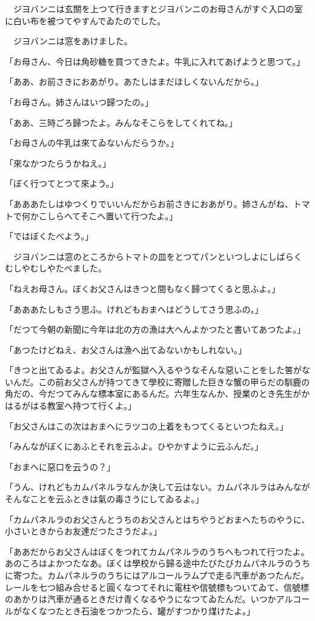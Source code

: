 \documentclass[tate,paper=b6j,jafontsize=9pt]{jlreq}
\begin{document}
　ジヨバンニは玄關を上つて行きますとジヨバンニのお母さんがすぐ入口の室に白い布を被つてやすんでゐたのでした。

　ジヨバンニは窓をあけました。

「お母さん、今日は角砂糖を買つてきたよ。牛乳に入れてあげようと思つて。」

「ああ、お前さきにおあがり。あたしはまだほしくないんだから。」

「お母さん。姉さんはいつ歸つたの。」

「ああ、三時ごろ歸つたよ。みんなそこらをしてくれてね。」

「お母さんの牛乳は來てゐないんだらうか。」

「來なかつたらうかねえ。」

「ぼく行つてとつて來よう。」

「あああたしはゆつくりでいいんだからお前さきにおあがり。姉さんがね、トマトで何かこしらへてそこへ置いて行つたよ。」

「ではぼくたべよう。」

　ジヨバンニは窓のところからトマトの皿をとつてパンといつしよにしばらくむしやむしやたべました。

「ねえお母さん。ぼくお父さんはきつと間もなく歸つてくると思ふよ。」

「あああたしもさう思ふ。けれどもおまへはどうしてさう思ふの。」

「だつて今朝の新聞に今年は北の方の漁は大へんよかつたと書いてあつたよ。」

「あつたけどねえ、お父さんは漁へ出てゐないかもしれない。」

「きつと出てゐるよ。お父さんが監獄へ入るやうなそんな惡いことをした筈がないんだ。この前お父さんが持つてきて學校に寄贈した巨きな蟹の甲らだの馴鹿の角だの、今だつてみんな標本室にあるんだ。六年生なんか、授業のとき先生がかはるがはる教室へ持つて行くよ。」

「お父さんはこの次はおまへにラツコの上着をもつてくるといつたねえ。」

「みんながぼくにあふとそれを云ふよ。ひやかすように云ふんだ。」

「おまへに惡口を云うの？」

「うん、けれどもカムパネルラなんか決して云はない。カムパネルラはみんながそんなことを云ふときは氣の毒さうにしてゐるよ。」

「カムパネルラのお父さんとうちのお父さんとはちやうどおまへたちのやうに、小さいときからお友達だつたさうだよ。」

「ああだからお父さんはぼくをつれてカムパネルラのうちへもつれて行つたよ。あのころはよかつたなあ。ぼくは學校から歸る途中たびたびカムパネルラのうちに寄つた。カムパネルラのうちにはアルコールラムプで走る汽車があつたんだ。レールを七つ組み合せると圓くなつてそれに電柱や信號標もついてゐて、信號標のあかりは汽車が通るときだけ青くなるやうになつてゐたんだ。いつかアルコールがなくなつたとき石油をつかつたら、罐がすつかり煤けたよ。」
\end{document}
